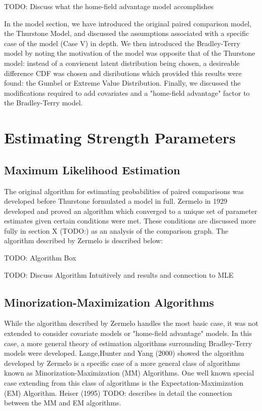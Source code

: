 \documentclass{article}
\begin{document}
TODO: Discuss what the home-field advantage model accomplishes


In the model section, we have introduced the original paired comparison model, the Thurstone Model, and discussed the assumptions associated with a specific case of the model (Case V) in depth. We then introduced the Bradley-Terry model by noting the motivation of the model was opposite that of the Thurstone model: instead of a convienent latent distribution being chosen, a desireable difference CDF was chosen and disributions which provided this results were found: the Gumbel or Extreme Value Distribution. Finally, we discussed the modifications required to add covariates and a "home-field advantage" factor to the Bradley-Terry model.

\section{Estimating Strength Parameters}

\subsection{Maximum Likelihood Estimation}

The original algorithm for estimating probabilities of paired comparisons was developed before Thurstone formulated a model in full. Zermelo in 1929 developed and proved an algorithm which converged to a unique set of parameter estimates given certain conditions were met. These conditions are discussed more fully in section X (TODO:) as an analysis of the comparison graph. The algorithm described by Zermelo is described below:

TODO: Algorithm Box

TODO: Discuss Algorithm Intuitively and results and connection to MLE

\subsection{Minorization-Maximization Algorithms}

While the algorithm described by Zermelo handles the most basic case, it was not extended to consider covariate models or "home-field advantage" models. In this case, a more general theory of estimation algorithms surrounding Bradley-Terry models were developed. Lange,Hunter and Yang (2000) showed the algorithm developed by Zermelo is a specific case of a more general class of algorithms known as Minorization-Maximization (MM) Algorithms. One well known special case extending from this class of algorithms is the Expectation-Maximization (EM) Algorithm. Heiser (1995) TODO: describes in detail the connection between the MM and EM algorithms. 
\end{document}
